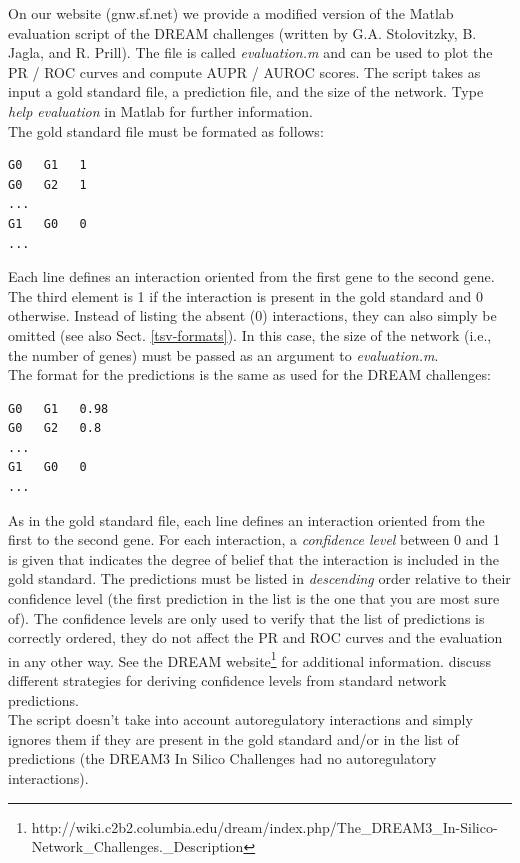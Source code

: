 \documentclass{llncs}
\begin{document}
On our website (gnw.sf.net) we provide a modified version of the Matlab evaluation script of the DREAM challenges (written by G.A. Stolovitzky, B. Jagla, and R. Prill). The file is called \emph{evaluation.m} and can be used to plot the PR / ROC curves and compute AUPR / AUROC scores. The script takes as input a gold standard file, a prediction file, and the size of the network. Type \emph{help evaluation} in Matlab for further information.\\

The gold standard file must be formated as follows:
\begin{verbatim}
G0   G1   1
G0   G2   1
...
G1   G0   0
...
\end{verbatim}
Each line defines an interaction oriented from the first gene to the second gene. The third element is 1 if the interaction is present in the gold standard and 0 otherwise. Instead of listing the absent (0) interactions, they can also simply be omitted (see also Sect. \ref{tsv-formats}). In this case, the size of the network (i.e., the number of genes) must be passed as an argument to \emph{evaluation.m}.\\

The format for the predictions is the same as used for the DREAM challenges:
\begin{verbatim}
G0   G1   0.98
G0   G2   0.8
...
G1   G0   0
...
\end{verbatim}
As in the gold standard file, each line defines an interaction oriented from the first to the second gene. For each interaction, a \emph{confidence level} between 0 and 1 is given that indicates the degree of belief that the interaction is included in the gold standard. The predictions must be listed in \emph{descending} order relative to their confidence level (the first prediction in the list is the one that you are most sure of). The confidence levels are only used to verify that the list of predictions is correctly ordered, they do not affect the PR and ROC curves and the evaluation in any other way. See the DREAM website\footnote{http://wiki.c2b2.columbia.edu/dream/index.php/The\_DREAM3\_In-Silico-Network\_Challenges.\_Description} for additional information. \citet{Marbach2008} discuss different strategies for deriving confidence levels from standard network predictions. \\

The script doesn't take into account autoregulatory interactions and simply ignores them if they are present in the gold standard and/or in the list of predictions (the DREAM3 In Silico Challenges had no autoregulatory interactions).
\end{document}
